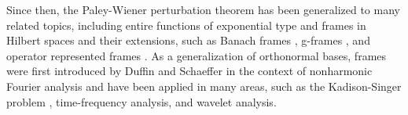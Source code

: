 \documentclass{amsart}
\numberwithin{equation}{section}
\theoremstyle{plain}
\theoremstyle{definition}
\begin{document}
Since then, the Paley-Wiener perturbation theorem has been generalized to many related topics, including
entire functions of exponential type \cite{young2001introduction} and frames in Hilbert spaces \cite{christensen1995paley, christensen1995frame, cazassa1997perturbation} and their extensions, such as Banach frames  \cite{christensen1997perturbations}, g-frames \cite{sun2007stability}, and operator represented frames \cite{christensen2017operator}. As a generalization of orthonormal bases, frames were first introduced by Duffin and Schaeffer in the context of nonharmonic Fourier analysis \cite{duffin1952class} and have been applied in many areas, such as the Kadison-Singer problem \cite{casazza2013kadison},  time-frequency analysis\cite{grochenig2001foundations}, and wavelet analysis\cite{daubechies1992ten}.   
\end{document}
